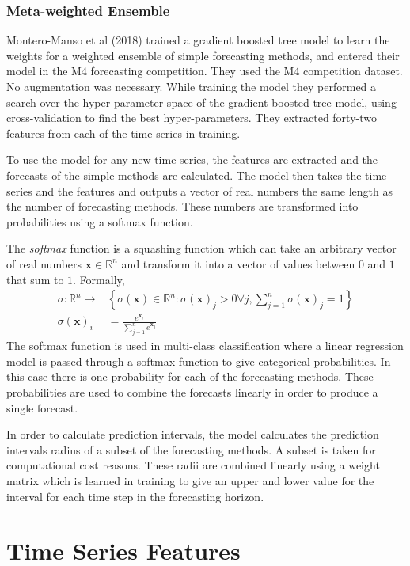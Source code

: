 \documentclass[a4paper,12pt]{article}
\theoremstyle{definition}
\begin{document}
\subsubsection{Meta-weighted Ensemble\cite{hyndman}}
Montero-Manso et al (2018) trained a gradient boosted tree model to learn the weights for a weighted ensemble of simple forecasting methods, and entered their model in the M4 forecasting competition. They used the M4 competition dataset. No augmentation was necessary. While training the model they performed a search over the hyper-parameter space of the gradient boosted tree model, using cross-validation to find the best hyper-parameters. They extracted forty-two features from each of the time series in training.

To use the model for any new time series, the features are extracted and the forecasts of the simple methods are calculated. The model then takes the time series and the features and outputs a vector of real numbers the same length as the number of forecasting methods. These numbers are transformed into probabilities using a softmax function.

The \textit{softmax} function is a squashing function which can take an arbitrary vector of real numbers $\mathbf{x} \in \mathbb{R}^n$ and transform it into a vector of values between $0$ and $1$ that sum to $1$. Formally,
\begin{align}
	\sigma : \mathbb{R}^n \rightarrow& \left\{ \sigma(\mathbf{x}) \in \mathbb{R}^n : \sigma(\mathbf{x})_j > 0 \forall j, \sum_{j=1}^n \sigma(\mathbf{x})_j = 1 \right\} \\
	\sigma(\mathbf{x})_i &= \frac{e^{\mathbf{x}_i}}{\sum_{j=1}^n e^{\mathbf{x}_j}}
\end{align} 
The softmax function is used in multi-class classification where a linear regression model is passed through a softmax function to give categorical probabilities. In this case there is one probability for each of the forecasting methods. These probabilities are used to combine the forecasts linearly in order to produce a single forecast.

In order to calculate prediction intervals, the model calculates the prediction intervals radius of a subset of the forecasting methods. A subset is taken for computational cost reasons. These radii are combined linearly using a weight matrix which is learned in training to give an upper and lower value for the interval for each time step in the forecasting horizon.

\section{Time Series Features}
\end{document}
